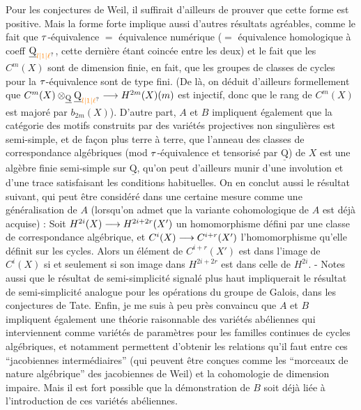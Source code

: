 Pour les conjectures de Weil, il suffirait d'ailleurs de prouver que cette forme est positive. Mais la forme forte implique aussi d'autres résultats agréables, comme le fait que $\tau$-équivalence $=$ équivalence numérique ($=$ équivalence homologique à coeff $\underline{\mathrm{Q}}_{\unsure{l|1|\ell}}$, cette dernière étant coincée entre les deux) et le fait que les $C^m(X)$ sont de dimension finie,
en fait, que les groupes de classes de cycles pour la $\tau$-équivalence sont de type fini. (De là, on déduit d'ailleurs formellement que $C^m(X)\otimes_{\underline{\mathrm{Q}}}\underline{\mathrm{Q}}_{\unsure{l|1|\ell}}\handwritten{\longrightarrow} H^{2m}(X)(m)$ est injectif, donc que le rang de $C^m(X)$ est majoré par $b_{2m}(X)$). D'autre part, $A$ et $B$ impliquent également que la catégorie des motifs construits par des variétés projectives non singulières est semi-simple, et de façon plus terre à terre, que l'anneau des classes de correspondance algébriques (mod $\tau$-équivalence et tensorisé par $\underline{\mathrm{Q}}$) de $X$ est une algèbre finie semi-simple sur $\underline{\mathrm{Q}}$, qu'on peut d'ailleurs munir d'une involution et d'une trace satisfaisant les conditions habituelles. On en conclut aussi le résultat suivant, qui peut être considéré dans une certaine mesure comme une généralisation de $A$ (lorsqu'on admet que la variante cohomologique de $A$ est déjà acquise) : Soit $H^{2i}(X)\longrightarrow H^{2i+2r}(X')$ un homomorphisme défini par une classe de correspondance algébrique, et $C^i(X)\longrightarrow C^{i+r}(X')$ l'homomorphisme qu'elle définit sur les cycles. Alors un élément de $C^{i+r}(X')$ est dans l'image de $C^i(X)$ si et seulement si son image dans $H^{2i+2r}$ est dans celle de $H^{2i}$. - Notes aussi que le résultat de semi-simplicité signalé plus haut impliquerait le résultat de semi-simplicité analogue pour les opérations du groupe de Galois, dans les conjectures de Tate. Enfin, je me suis à peu près convaincu que $A$ et $B$ impliquent également une théorie raisonnable des variétés abéliennes qui interviennent comme variétés de paramètres pour les familles continues de cycles algébriques, et notamment permettent d'obtenir les relations qu'il faut entre ces ``jacobiennes intermédiaires'' (qui peuvent être conçues comme les ``morceaux de nature algébrique'' des jacobiennes de Weil) et la cohomologie de dimension impaire. Mais il est fort possible que la démonstration de $B$ soit déjà liée à l'introduction de ces variétés abéliennes.

